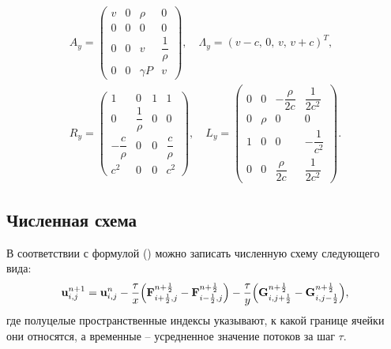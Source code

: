 \documentclass[12pt,a4paper]{article}
\newcommand{\half}{\frac{1}{2}}
\begin{document}
        \begin{equation}
            \label{eigen2d:y}
            \begin{array}{c}
                A_y = \begin{pmatrix}
                    v & 0 & \rho & 0 \\
                    0 & 0 & 0 & 0 \\
                    0 & 0 & v & \dfrac{1}{\rho} \\[2mm]
                    0 & 0 & \gamma P & v
                \end{pmatrix}, \quad 
                \Lambda_y = (v - c,\, 0,\, v,\, v + c)^T, \\[3mm]
                R_y = \begin{pmatrix}
                    1 & 0 & 1 & 1 \\
                    0 & \dfrac{1}{\rho} & 0 & 0 \\
                    -\dfrac{c}{\rho} & 0 & 0 & \dfrac{c}{\rho} \\[2mm]
                    c^2 & 0 & 0 & c^2
                \end{pmatrix}, \quad 
                L_y = \begin{pmatrix}
                    0 & 0 & -\dfrac{\rho}{2c} & \dfrac{1}{2c^2} \\
                    0 & \rho & 0 & 0 \\
                    1 & 0 & 0 & -\dfrac{1}{c^2} \\[3mm]
                    0 & 0 & \dfrac{\rho}{2c} & \dfrac{1}{2c^2}
                \end{pmatrix}.
            \end{array}
        \end{equation}

    \subsection{Численная схема}

    В соответствии с формулой () можно записать численную схему следующего вида:
    \begin{equation}
        \label{system:difference}
        \bold u^{n + 1}_{i, j} = \bold u^{n}_{i, j} - \dfrac{\tau}{\Delta x} \Bigl( \bold F^{n + \half}_{i + \half, j} - \bold F^{n + \half}_{i - \half, j} \Bigr) - \dfrac{\tau}{\Delta y} \Bigl( \bold G^{n + \half}_{i, j + \half} - \bold G^{n + \half}_{i, j - \half} \Bigr),
    \end{equation}
    \noindent где полуцелые пространственные индексы указывают, к какой границе ячейки они относятся, а временные -- усредненное значение потоков за шаг $ \tau $.
\end{document}
